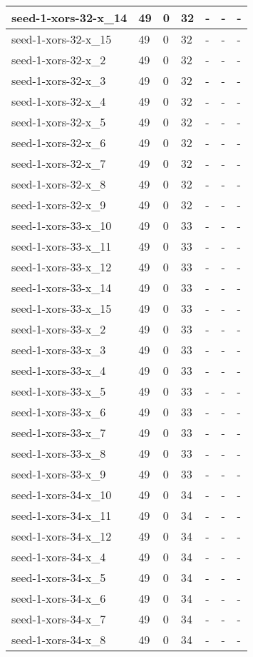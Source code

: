 \begin{scriptsize}
\begin{longtable}{|p{5cm}|l|l|l|l|l|l|}
seed-1-xors-32-x\_14&49&0&32&-&-&- \\ \hline 
seed-1-xors-32-x\_15&49&0&32&-&-&- \\ \hline 
seed-1-xors-32-x\_2&49&0&32&-&-&- \\ \hline 
seed-1-xors-32-x\_3&49&0&32&-&-&- \\ \hline 
seed-1-xors-32-x\_4&49&0&32&-&-&- \\ \hline 
seed-1-xors-32-x\_5&49&0&32&-&-&- \\ \hline 
seed-1-xors-32-x\_6&49&0&32&-&-&- \\ \hline 
seed-1-xors-32-x\_7&49&0&32&-&-&- \\ \hline 
seed-1-xors-32-x\_8&49&0&32&-&-&- \\ \hline 
seed-1-xors-32-x\_9&49&0&32&-&-&- \\ \hline 
seed-1-xors-33-x\_10&49&0&33&-&-&- \\ \hline 
seed-1-xors-33-x\_11&49&0&33&-&-&- \\ \hline 
seed-1-xors-33-x\_12&49&0&33&-&-&- \\ \hline 
seed-1-xors-33-x\_14&49&0&33&-&-&- \\ \hline 
seed-1-xors-33-x\_15&49&0&33&-&-&- \\ \hline 
seed-1-xors-33-x\_2&49&0&33&-&-&- \\ \hline 
seed-1-xors-33-x\_3&49&0&33&-&-&- \\ \hline 
seed-1-xors-33-x\_4&49&0&33&-&-&- \\ \hline 
seed-1-xors-33-x\_5&49&0&33&-&-&- \\ \hline 
seed-1-xors-33-x\_6&49&0&33&-&-&- \\ \hline 
seed-1-xors-33-x\_7&49&0&33&-&-&- \\ \hline 
seed-1-xors-33-x\_8&49&0&33&-&-&- \\ \hline 
seed-1-xors-33-x\_9&49&0&33&-&-&- \\ \hline 
seed-1-xors-34-x\_10&49&0&34&-&-&- \\ \hline 
seed-1-xors-34-x\_11&49&0&34&-&-&- \\ \hline 
seed-1-xors-34-x\_12&49&0&34&-&-&- \\ \hline 
seed-1-xors-34-x\_4&49&0&34&-&-&- \\ \hline 
seed-1-xors-34-x\_5&49&0&34&-&-&- \\ \hline 
seed-1-xors-34-x\_6&49&0&34&-&-&- \\ \hline 
seed-1-xors-34-x\_7&49&0&34&-&-&- \\ \hline 
seed-1-xors-34-x\_8&49&0&34&-&-&- \\ \hline 

\end{longtable}
\end{scriptsize}
